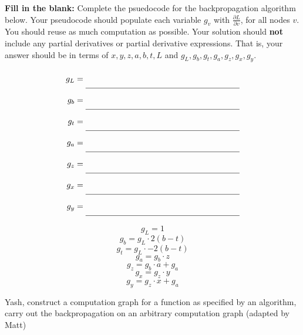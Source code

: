 \begin{parts}
\begin{subparts}
\subpart[4] \textbf{Fill in the blank:} Complete the psuedocode for the backpropagation algorithm below.
Your pseudocode should populate each variable $g_v$ with $\frac{\partial L}{\partial v}$, for all nodes $v$. You should reuse as much computation as possible. Your solution should \textbf{not} include any partial derivatives or partial derivative expressions. That is, your answer should be in terms of $x,y,z,a,b,t,L$ and $g_L, g_b, g_t, g_a, g_z, g_x, g_y$.

 \newcommand{\blankspace}{ \text{\underline{\phantom{$\frac{1}{2}$\hspace{18em}}}} }

\begin{align*}
            g_L &= \blankspace \\
            g_{b} &= \blankspace \\
            g_{t} &= \blankspace \\
            g_{a} &= \blankspace \\
            g_{z} &= \blankspace \\
            g_{x} &= \blankspace \\
            g_{y} &= \blankspace 
\end{align*}

    \begin{soln}

    \[
    g_L = 1
    \]
    \[
    g_b = g_L \cdot 2(b - t)
    \]
    \[
    g_t = g_L \cdot -2(b - t)
    \]
    \[
    g_a = g_b \cdot z
    \]
    \[
    g_z = g_b \cdot a + g_a
    \]
    \[
    g_x = g_z \cdot y
    \]
    \[
    g_y = g_z \cdot x + g_a
    \]
    \end{soln}
    \begin{qauthor}
    Yash, construct a computation graph for a function as specified by an algorithm, carry out the backpropagation on an arbitrary computation graph
    (adapted by Matt)
    \end{qauthor}


\end{subparts}
\end{parts}

